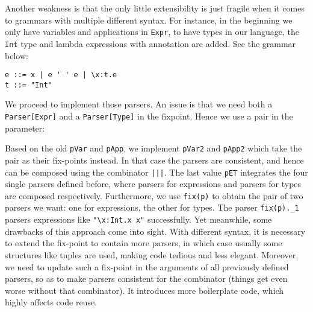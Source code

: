 Another weakness is that the only little extensibility is just fragile when it comes to grammars with multiple different syntax. For instance, in the beginning we only have variables and applications in \lstinline{Expr}, to have types in our language, the \lstinline{Int} type and lambda expressions with annotation are added. See the grammar below:
\begin{lstlisting}
e ::= x | e ' ' e | \x:t.e
t ::= "Int"
\end{lstlisting}

We proceed to implement those parsers. An issue is that we need both a \lstinline{Parser[Expr]} and a \lstinline{Parser[Type]} in the fixpoint.
Hence we use a pair in the parameter:


Based on the old \lstinline{pVar} and \lstinline{pApp}, we implement \lstinline{pVar2} and \lstinline{pApp2} which take the pair as their fix-points instead.
In that case the parsers are consistent, and hence can be composed using the combinator \lstinline{|||}.
The last value \lstinline{pET} integrates the four single parsers defined before, where parsers for expressions and parsers for types are composed respectively. Furthermore, we use \lstinline{fix(p)} to obtain the pair of two parsers we want: one for expressions, the other for types. The parser \lstinline{fix(p)._1} parsers expressions like \lstinline{"\x:Int.x x"} successfully. Yet meanwhile, some drawbacks of this approach come into sight. With different syntax, it
is necessary to extend the fix-point to contain more parsers, in which case usually some structures like tuples are used,
making code tedious and less elegant. Moreover, we need to update such a fix-point in the arguments of all previously defined parsers, so as to make parsers consistent for the combinator (things get even worse without that combinator). It introduces more boilerplate code, which highly affects code reuse.

